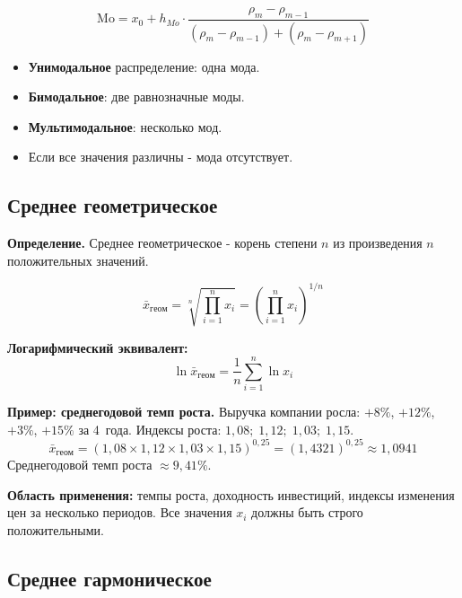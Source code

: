 \documentclass[a4paper]{article}
\begin{document}
\begin{equation}
	\text{Mo} = x_0 + h_{Mo} \cdot \frac{\rho_m - \rho_{m-1}}{(\rho_m - \rho_{m-1}) + (\rho_m - \rho_{m+1})} 
\end{equation}

\begin{itemize}[noitemsep]
	\item \textbf{Унимодальное} распределение: одна мода.
	\item \textbf{Бимодальное}: две равнозначные моды.
	\item \textbf{Мультимодальное}: несколько мод.
	\item Если все значения различны - мода отсутствует.
\end{itemize}



\subsection{Среднее геометрическое}


	\textbf{Определение.} Среднее геометрическое - корень степени $n$ из произведения
	$n$ положительных значений.


\begin{equation}
	\bar{x}_{геом} = \sqrt[n]{\prod_{i=1}^{n} x_i} = \left(\prod_{i=1}^{n} x_i\right)^{1/n}
\end{equation}

\noindent\textbf{Логарифмический эквивалент:}
\[
\ln \bar{x}_{геом} = \frac{1}{n}\sum_{i=1}^{n} \ln x_i
\]


	\textbf{Пример: среднегодовой темп роста.}
	Выручка компании росла: $+8\%$, $+12\%$, $+3\%$, $+15\%$ за 4~года.
	Индексы роста: $1{,}08;\; 1{,}12;\; 1{,}03;\; 1{,}15$.
	\[
	\bar{x}_{геом} = (1{,}08 \times 1{,}12 \times 1{,}03 \times 1{,}15)^{0{,}25}
	= (1{,}4321)^{0{,}25} \approx 1{,}0941
	\]
	Среднегодовой темп роста $\approx 9{,}41\%$.



	\textbf{Область применения:} темпы роста, доходность инвестиций, индексы изменения
	цен за несколько периодов. Все значения $x_i$ должны быть строго положительными.


\subsection{Среднее гармоническое}
\end{document}
